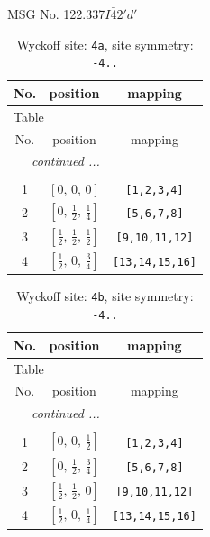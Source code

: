 \documentclass[fleqn,8pt]{jsarticle}
\begin{document}
\setcounter{MaxMatrixCols}{32}

\renewcommand{\tablename}{Table~}
\renewcommand{\figurename}{Figure~}
\begin{center}
\LARGE
MSG No. 122.337\quad$I\bar{4}2'd'$
\end{center}
\renewcommand{\arraystretch}{1.2}
\begin{longtable}{ccc}
\caption{Wyckoff site: {\tt 4a}, site symmetry: {\tt -4..}}
 \\
 \hline \hline
No. & position & mapping \\ \hline \endfirsthead

\multicolumn{2}{l}{\tablename\ \thetable{}} \\
 \hline \hline
No. & position & mapping \\ \hline \endhead

 \hline \hline
\multicolumn{2}{r}{\footnotesize\it continued ...} \\ \endfoot

 \hline \hline
\multicolumn{2}{r}{} \\ \endlastfoot

1 & $\left[ 0,\, 0,\, 0 \right]$ & {\tt [1,2,3,4]} \\ \hline
2 & $\left[ 0,\, \frac{1}{2},\, \frac{1}{4} \right]$ & {\tt [5,6,7,8]} \\ \hline
3 & $\left[ \frac{1}{2},\, \frac{1}{2},\, \frac{1}{2} \right]$ & {\tt [9,10,11,12]} \\ \hline
4 & $\left[ \frac{1}{2},\, 0,\, \frac{3}{4} \right]$ & {\tt [13,14,15,16]} \\
\end{longtable}
\renewcommand{\arraystretch}{1.2}
\begin{longtable}{ccc}
\caption{Wyckoff site: {\tt 4b}, site symmetry: {\tt -4..}}
 \\
 \hline \hline
No. & position & mapping \\ \hline \endfirsthead

\multicolumn{2}{l}{\tablename\ \thetable{}} \\
 \hline \hline
No. & position & mapping \\ \hline \endhead

 \hline \hline
\multicolumn{2}{r}{\footnotesize\it continued ...} \\ \endfoot

 \hline \hline
\multicolumn{2}{r}{} \\ \endlastfoot

1 & $\left[ 0,\, 0,\, \frac{1}{2} \right]$ & {\tt [1,2,3,4]} \\ \hline
2 & $\left[ 0,\, \frac{1}{2},\, \frac{3}{4} \right]$ & {\tt [5,6,7,8]} \\ \hline
3 & $\left[ \frac{1}{2},\, \frac{1}{2},\, 0 \right]$ & {\tt [9,10,11,12]} \\ \hline
4 & $\left[ \frac{1}{2},\, 0,\, \frac{1}{4} \right]$ & {\tt [13,14,15,16]} \\
\end{longtable}
\end{document}
